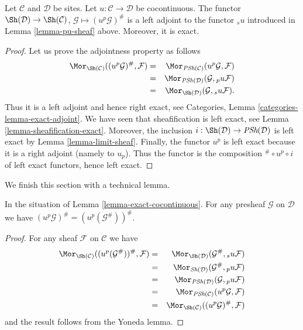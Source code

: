 \begin{lemma}
\label{lemma-exact-cocontinuous}
Let $\mathcal{C}$ and $\mathcal{D}$ be sites.
Let $u : \mathcal{C} \to \mathcal{D}$ be cocontinuous.
The functor
$\Sh(\mathcal{D}) \to \Sh(\mathcal{C})$,
$\mathcal{G} \mapsto (u^p\mathcal{G})^\#$
is a left adjoint to the functor ${}_su$ introduced
in Lemma \ref{lemma-pu-sheaf} above. Moreover, it
is exact.
\end{lemma}

\begin{proof}
Let us prove the adjointness property as follows
\begin{eqnarray*}
\Mor_{\Sh(\mathcal{C})}
((u^p\mathcal{G})^\#, \mathcal{F})
& = &
\Mor_{\textit{PSh}(\mathcal{C})}
(u^p\mathcal{G}, \mathcal{F}) \\
& = &
\Mor_{\textit{PSh}(\mathcal{D})}
(\mathcal{G}, {}_pu\mathcal{F}) \\
& = &
\Mor_{\Sh(\mathcal{D})}
(\mathcal{G}, {}_su\mathcal{F}).
\end{eqnarray*}
Thus it is a left adjoint and hence right exact,
see Categories, Lemma \ref{categories-lemma-exact-adjoint}.
We have seen that sheafification is left exact,
see Lemma \ref{lemma-sheafification-exact}.
Moreover, the inclusion
$i : \Sh(\mathcal{D}) \to \textit{PSh}(\mathcal{D})$
is left exact by Lemma \ref{lemma-limit-sheaf}. Finally, the functor
$u^p$ is left exact because it is a right adjoint
(namely to $u_p$). Thus the functor is the composition
${}^\# \circ u^p \circ i$ of left exact functors,
hence left exact.
\end{proof}

\noindent
We finish this section with a technical lemma.

\begin{lemma}
\label{lemma-technical-pu}
In the situation of Lemma \ref{lemma-exact-cocontinuous}.
For any presheaf $\mathcal{G}$ on $\mathcal{D}$
we have $(u^p\mathcal{G})^\# = (u^p(\mathcal{G}^\#))^\#$.
\end{lemma}

\begin{proof}
For any sheaf $\mathcal{F}$ on $\mathcal{C}$ we have
\begin{eqnarray*}
\Mor_{\Sh(\mathcal{C})}((u^p(\mathcal{G}^\#))^\#, \mathcal{F})
& = &
\Mor_{\Sh(\mathcal{D})}(\mathcal{G}^\#, {}_su\mathcal{F}) \\
& = &
\Mor_{\textit{Sh}(\mathcal{D})}(\mathcal{G}^\#, {}_pu\mathcal{F}) \\
& = &
\Mor_{\textit{PSh}(\mathcal{D})}(\mathcal{G}, {}_pu\mathcal{F}) \\
& = &
\Mor_{\textit{PSh}(\mathcal{C})}(u^p\mathcal{G}, \mathcal{F}) \\
& = &
\Mor_{\Sh(\mathcal{C})}((u^p\mathcal{G})^\#, \mathcal{F})
\end{eqnarray*}
and the result follows from the Yoneda lemma.
\end{proof}

